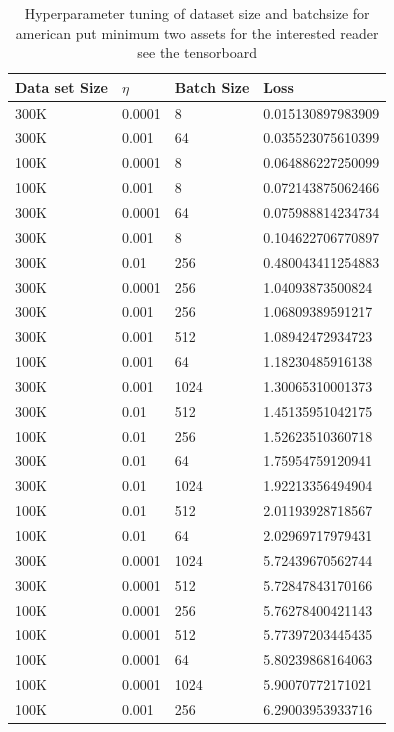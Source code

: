 \begin{table}[H]
\caption{Hyperparameter tuning of dataset size and batchsize for american put minimum two assets for the interested reader see the tensorboard}
\label{tab:fullhyperAmerMin4}
\centering
\begin{tabular}{llll}
\toprule
\textbf{Data set Size} & \textbf{$\eta$} & \textbf{Batch Size} & \textbf{Loss} \\
\midrule
300K    & 0.0001 & 8     & 0.015130897983909 \\ 
300K    & 0.001  & 64    & 0.035523075610399 \\ 
100K    & 0.0001 & 8     & 0.064886227250099 \\ 
100K    & 0.001  & 8     & 0.072143875062466 \\ 
300K    & 0.0001 & 64    & 0.075988814234734 \\ 
300K    & 0.001  & 8     & 0.104622706770897 \\ 
300K    & 0.01   & 256   & 0.480043411254883 \\ 
300K    & 0.0001 & 256   & 1.04093873500824  \\ 
300K    & 0.001  & 256   & 1.06809389591217  \\ 
300K    & 0.001  & 512   & 1.08942472934723  \\ 
100K    & 0.001  & 64    & 1.18230485916138  \\ 
300K    & 0.001  & 1024  & 1.30065310001373  \\ 
300K    & 0.01   & 512   & 1.45135951042175  \\ 
100K    & 0.01   & 256   & 1.52623510360718  \\ 
300K    & 0.01   & 64    & 1.75954759120941  \\ 
300K    & 0.01   & 1024  & 1.92213356494904  \\ 
100K    & 0.01   & 512   & 2.01193928718567  \\ 
100K    & 0.01   & 64    & 2.02969717979431  \\ 
300K    & 0.0001 & 1024  & 5.72439670562744  \\ 
300K    & 0.0001 & 512   & 5.72847843170166  \\ 
100K    & 0.0001 & 256   & 5.76278400421143  \\ 
100K    & 0.0001 & 512   & 5.77397203445435  \\ 
100K    & 0.0001 & 64    & 5.80239868164063  \\ 
100K    & 0.0001 & 1024  & 5.90070772171021  \\ 
100K    & 0.001  & 256   & 6.29003953933716  \\ 

\end{tabular}
\end{table}
